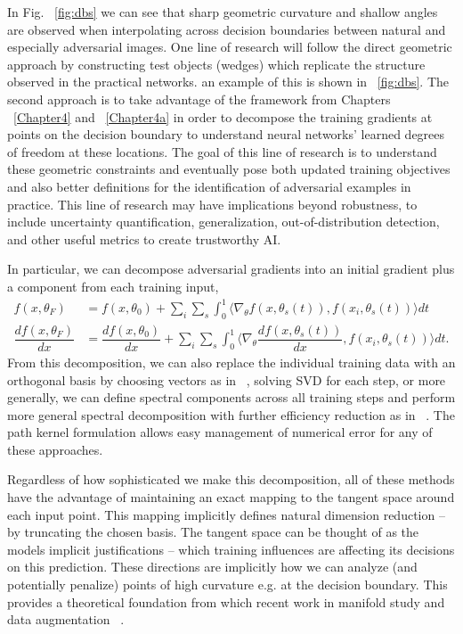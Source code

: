 In Fig. ~\ref{fig:dbs} we can see that sharp geometric curvature
and shallow angles are observed when interpolating across decision
boundaries between natural and especially adversarial images. One line
of research will follow the direct geometric approach by constructing
test objects (wedges) which replicate the structure observed in the
practical networks. an example of this is shown in ~\ref{fig:dbs}. The
second approach is to take advantage of the framework from Chapters
~\ref{Chapter4} and ~\ref{Chapter4a} in order to decompose the
training gradients at points on the decision boundary to understand
neural networks' learned degrees of freedom at these locations. The
goal of this line of research is to understand these geometric
constraints and eventually pose both updated training objectives and
also better definitions for the identification of adversarial examples
in practice. This line of research may have implications beyond
robustness, to include uncertainty quantification, generalization,
out-of-distribution detection, and other useful metrics to create
trustworthy AI.

In particular, we can decompose adversarial gradients into an
initial gradient plus a component from each training input,
\begin{align}
  f(x, \theta_F) &= f(x, \theta_0) + \sum_i \sum_s \int_0^1 \langle
  \nabla_\theta f(x, \theta_s(t)), f(x_i, \theta_s(t))\rangle dt \\
  \dfrac{d f(x, \theta_F)}{dx} &= \dfrac{d f(x, \theta_0)}{dx} + \sum_i \sum_s \int_0^1 \langle
  \nabla_\theta \dfrac{d f(x, \theta_s(t))}{dx}, f(x_i,
                                 \theta_s(t))\rangle dt.
\end{align}
From this decomposition, we can also replace the individual training
data with an orthogonal basis by choosing vectors as in
~\citet{halko2011finding}, solving SVD for each step, or more
generally, we can define spectral components across all training steps
and perform more general spectral decomposition with further
efficiency reduction as in ~\citet{tancik2020fourierfeatures}. The path kernel
formulation allows easy management of numerical error for any of these
approaches. 

Regardless of how sophisticated we make this decomposition, all of
these methods have the advantage of maintaining an exact mapping to
the tangent space around each input point. This mapping implicitly
defines natural dimension reduction -- by truncating the chosen
basis. The tangent space can be thought of as the models implicit
justifications -- which training influences are affecting its
decisions on this prediction. These directions are implicitly how we
can analyze (and potentially penalize) points of high curvature
e.g. at the decision boundary. This provides a theoretical foundation
from which recent work in manifold study and data augmentation
~\citep{kaufman_data_2023, liu_linear_2023, sipka_differentiable_2023,
  cha_orthogonality-enforced_2023, marbut_reliable_2023,
  gao_out--domain_2023, oh_provable_2023, chen2023aware}. 


